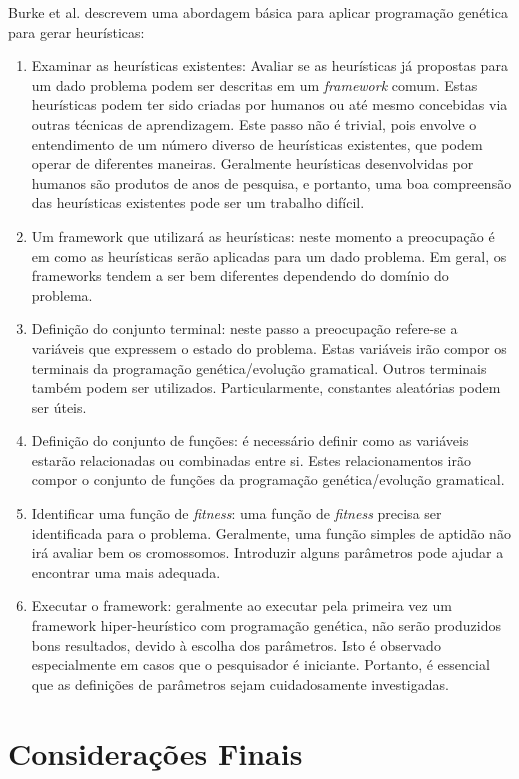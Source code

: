 Burke et al.  descrevem uma abordagem básica \cite{burke2009exploring} para aplicar programação genética para gerar heurísticas:

\begin{enumerate}
	\item Examinar as heurísticas existentes: Avaliar se as heurísticas já propostas para um dado problema podem ser descritas em um \textit{framework} comum. Estas heurísticas podem ter sido criadas por humanos ou até mesmo concebidas via outras técnicas de aprendizagem. Este passo não é trivial, pois envolve o entendimento de um número diverso de heurísticas existentes, que podem operar de diferentes maneiras. Geralmente heurísticas desenvolvidas por humanos são produtos de anos de pesquisa, e portanto, uma boa compreensão das heurísticas existentes pode ser um trabalho difícil. 
	\item Um framework que utilizará as heurísticas: neste momento a preocupação é em como as heurísticas serão aplicadas para um dado problema. Em geral, os frameworks tendem a ser bem diferentes dependendo do domínio do problema. 
	\item Definição do conjunto terminal: neste passo a preocupação refere-se a variáveis que expressem o estado do problema. Estas variáveis irão compor os terminais da programação genética/evolução gramatical. Outros terminais também podem ser utilizados. Particularmente, constantes aleatórias podem ser úteis.
	\item Definição do conjunto de funções: é necessário definir como as variáveis estarão relacionadas ou combinadas entre si. Estes relacionamentos irão compor o conjunto de funções da programação genética/evolução gramatical. 
	\item Identificar uma função de \textit{fitness}: uma função de \textit{fitness} precisa ser identificada para o problema. Geralmente, uma função simples de aptidão não irá avaliar bem os cromossomos. Introduzir alguns parâmetros pode ajudar a encontrar uma mais adequada.
	\item Executar o framework: geralmente ao executar pela primeira vez um framework hiper-heurístico com programação genética, não serão produzidos bons resultados, devido à escolha dos parâmetros. Isto é observado especialmente em casos que o pesquisador é iniciante. Portanto, é essencial que as definições de parâmetros sejam cuidadosamente investigadas.
\end{enumerate}




\section{Considerações Finais}
\label{ReferencialTeorico:Conclusão}


